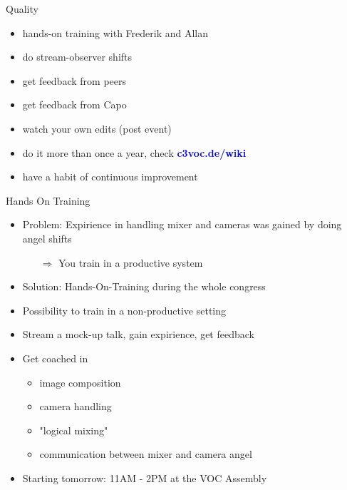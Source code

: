 \documentclass[hyperref={pdfpagelabels=false},aspectratio=169]{beamer}
\begin{document}
\begin{frame}{Quality}
\begin{itemize} %
\item hands-on training with Frederik and Allan %
\item do stream-observer shifts %
\item get feedback from peers %
\item get feedback from Capo %
\item watch your own edits (post event) %
\item do it more than once a year, check 
\textcolor{blue}{\textbf{c3voc.de/wiki }} %
\item have a habit of continuous improvement %
\end{itemize} 
\end{frame}

\begin{frame}{Hands On Training}
\begin{itemize}
\item Problem: Expirience in handling mixer and cameras was gained by doing angel shifts 
\begin{itemize}
\item[$\Rightarrow$] You train in a productive system
\end{itemize}
\item Solution: Hands-On-Training during the whole congress
\item Possibility to train in a non-productive setting
\item Stream a mock-up talk, gain expirience, get feedback
\item Get coached in
	\begin{itemize}
	\item image composition
	\item camera handling
	\item "logical mixing"
	\item communication between mixer and camera angel
	\end{itemize}
\item Starting tomorrow: 11AM - 2PM at the VOC Assembly
\end{itemize} 
\end{frame}
	
\end{document}
